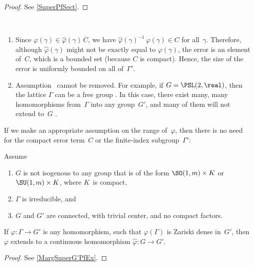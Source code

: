 \begin{proof}
See \cref{SuperPfSect}.
\end{proof}

\begin{rems} \label{SuperRem} \ 
\noprelistbreak
	\begin{enumerate}
	\item Since $\varphi(\gamma) \in \widehat\varphi(\gamma) \, C$, we have $\widehat\varphi(\gamma)^{-1} \, \varphi(\gamma) \in C$ for all~$\gamma$. Therefore, although $\widehat\varphi(\gamma)$ might not be exactly equal to $\varphi(\gamma)$, the error is an element of~$C$, which is a bounded set (because $C$ is compact). Hence, the size of the error is uniformly bounded on all of~$\Gamma'$.
 
	\item \label{SuperRem-NotSOSU}
	Assumption~ cannot be removed. For example, if $G = \PSL(2,\real)$, then the lattice $\Gamma$ can be a free group . In this case, there exist many, many homomorphisms from~$\Gamma$ into any group~$G'$, and many of them will not extend to~$G$ .

	\end{enumerate}
 \end{rems}

If we make an appropriate assumption on the range of~$\varphi$, then there is no need for the compact error term~$C$ or the finite-index subgroup~$\Gamma'$:

\begin{cor} \label{MargSuperG'}
Assume
\noprelistbreak
	\begin{enumerate} \renewcommand{\theenumi}{\roman{enumi}}
	\item \label{MargSuperG'-notSOSU}
	$G$ is not isogenous to any group that is of the form\/ $\SO(1,m) \times K$ or\/ $\SU(1,m) \times K$, where $K$~is compact,
	\item  \label{MargSuperG'-irred}
 $\Gamma$ is irreducible, 
 and
	\item  \label{MargSuperG'-G}
 $G$ and $G'$ are connected, with trivial center, and no compact factors.
	\end{enumerate}
If $\varphi \colon \Gamma \to G'$ is any homomorphism, such that $\varphi(\Gamma)$ is Zariski dense in~$G'$, then $\varphi$ extends to a continuous homomorphism $\widehat\varphi \colon G \to G'$.
\end{cor}

\begin{proof}
See \cref{MargSuperG'PfEx}.
\end{proof}
 

